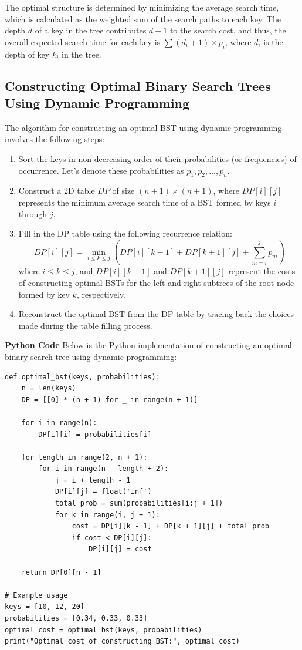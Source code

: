 \documentclass[12pt]{book} %
\begin{document}
The optimal structure is determined by minimizing the average search time, which is calculated as the weighted sum of the search paths to each key. The depth \(d\) of a key in the tree contributes \(d+1\) to the search cost, and thus, the overall expected search time for each key is \( \sum (d_i + 1) \times p_i \), where \(d_i\) is the depth of key \(k_i\) in the tree.


\subsection{Constructing Optimal Binary Search Trees Using Dynamic Programming}

The algorithm for constructing an optimal BST using dynamic programming involves the following steps:

\begin{enumerate}
    \item Sort the keys in non-decreasing order of their probabilities (or frequencies) of occurrence. Let's denote these probabilities as \( p_1, p_2, \ldots, p_n \).
    
    \item Construct a 2D table \( DP \) of size \( (n+1) \times (n+1) \), where \( DP[i][j] \) represents the minimum average search time of a BST formed by keys \( i \) through \( j \).
    
    \item Fill in the DP table using the following recurrence relation:
    \[
    DP[i][j] = \min_{i \leq k \leq j} \left( DP[i][k-1] + DP[k+1][j] + \sum_{m=i}^{j} p_m \right)
    \]
    where \( i \leq k \leq j \), and \( DP[i][k-1] \) and \( DP[k+1][j] \) represent the costs of constructing optimal BSTs for the left and right subtrees of the root node formed by key \( k \), respectively.
    
    \item Reconstruct the optimal BST from the DP table by tracing back the choices made during the table filling process.
\end{enumerate}
\FloatBarrier
\textbf{Python Code}
\FloatBarrier
Below is the Python implementation of constructing an optimal binary search tree using dynamic programming:
\FloatBarrier
\begin{lstlisting}
def optimal_bst(keys, probabilities):
    n = len(keys)
    DP = [[0] * (n + 1) for _ in range(n + 1)]

    for i in range(n):
        DP[i][i] = probabilities[i]

    for length in range(2, n + 1):
        for i in range(n - length + 2):
            j = i + length - 1
            DP[i][j] = float('inf')
            total_prob = sum(probabilities[i:j + 1])
            for k in range(i, j + 1):
                cost = DP[i][k - 1] + DP[k + 1][j] + total_prob
                if cost < DP[i][j]:
                    DP[i][j] = cost

    return DP[0][n - 1]

# Example usage
keys = [10, 12, 20]
probabilities = [0.34, 0.33, 0.33]
optimal_cost = optimal_bst(keys, probabilities)
print("Optimal cost of constructing BST:", optimal_cost)
\end{lstlisting}
\end{document}
